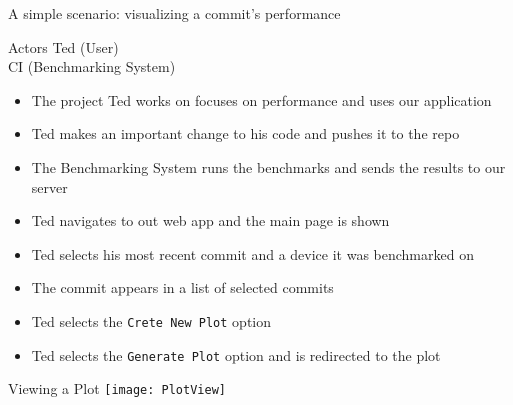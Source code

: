 \begin{frame}{A simple scenario: visualizing a commit's performance}
  \begin{block}{Actors}
    Ted (User)\\
    CI (Benchmarking System)
  \end{block}
  \begin{itemize}
    \item The project Ted works on focuses on performance and uses our application
    \item Ted makes an important change to his code and pushes it to the repo
    \item The Benchmarking System runs the benchmarks and sends the results to our server
    \item Ted navigates to out web app and the main page is shown
    \item Ted selects his most recent commit and a device it was benchmarked on
    \item The commit appears in a list of selected commits
    \item Ted selects the \texttt{Crete New Plot} option
    \item Ted selects the \texttt{Generate Plot} option and is redirected to the plot
  \end{itemize}
\end{frame}

\begin{frame}{Viewing a Plot}
  \texttt{[image: PlotView]}
\end{frame}
